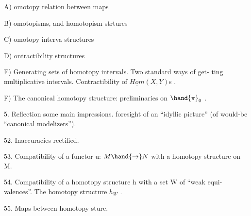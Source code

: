 A) omotopy relation between maps

B) omotopisms, and homotopism strtures

C) omotopy interva structures

D) ontractibility structures

E) Generating sets of homotopy intervals. Two standard ways of get-%
ting multiplicative intervals. Contractibility of $\underline{Hom}(X,Y)$s .

F) The canonical homotopy structure: preliminaries on $\hand{\pi}_{0}$ .

\hand{(}5.\hand{)} Reflection  some main impressions.  foresight of an ``idyllic
picture'' (of would-be ``canonical modelizers'').

52.  Inaccuracies rectified.

53.  Compatibility of a functor u: $M\hand{\rightarrow}N$ with a homotopy structure on M.

54.  Compatibility of a homotopy structure h with a set W of ``weak equi-%
valences''.  The homotopy structure $h_{W}$ .

55.  Maps between homotopy sture.

